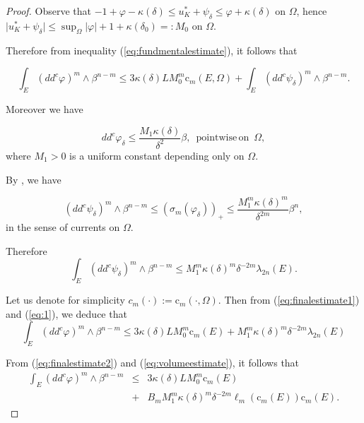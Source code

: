 \documentclass[12pt]{amsart}
\theoremstyle{definition}
\numberwithin{theorem}{section}
\numberwithin{equation}{section}
\begin{document}
{\begin{proof}
 Observe that $-1 + \varphi -  \kappa (\delta) \leq u_K^* + \psi_\delta  \leq \varphi + \kappa (\delta)$ on $\Omega$, hence   $\vert u_K^* + \psi_\delta\vert \leq \sup_{\Omega}  \vert \varphi\vert + 1 + \kappa (\delta_0) =: M_0$ on $\Omega$. 
 
 Therefore from inequality (\ref{eq:fundmentalestimate}), it follows that
 
\begin{equation} \label{eq:finalestimate1}
  \int_{E}(dd^c\varphi)^m\wedge\beta^{n-m} \leq 3 \kappa (\delta) L  M_0^m  \text{c}_m (E,\Omega) + \int_{E}(dd^c\psi_{\delta})^m\wedge\beta^{n-m}.
\end{equation}
 
 Moreover we have
 
 \begin{equation}\label{eq:1}
 dd^c\varphi_{\delta}\leq\frac{M_1 \kappa (\delta)}{\delta^{2}}  \beta, \, \, \, \mathrm{pointwise \, on} \, \, \, \Omega,
 \end{equation}
 where $M_1 > 0$ is a uniform constant depending only on $\Omega$.

By \cite[Theorem 3.3]{BZ20}, we have

\begin{equation}\label{eq:2}
 (dd^c\psi_{\delta})^m\wedge\beta^{n-m}  \leq  (\sigma_m (\varphi_{\delta}))_+ \leq\frac{M_1^m \kappa (\delta)^{m }}{\delta^{2 m}}  \beta^n,
 \end{equation}
 in the sense of currents on $ \Omega$.
 
 Therefore  
\begin{equation}\label{eq:3}
\int_{E}(dd^c\psi_{\delta})^m\wedge\beta^{n-m} \leq   M_1^{m} \kappa (\delta)^{m } \delta^{-2 m} \lambda_{2 n} (E).
 \end{equation}
 
 
Let us denote for simplicity $c_m (\cdot) :=  \text{c}_m (\cdot,\Omega)$. Then from (\ref{eq:finalestimate1}) and (\ref{eq:1}), we deduce that
\begin{equation}\label{eq:finalestimate2}
\int_{E}(dd^c\varphi)^m\wedge\beta^{n-m} \leq  3 \kappa (\delta) L M_0^m  \text{c}_m (E)+ M_1^{m} \kappa(\delta)^m \delta^{-2 m} \lambda_{2 n} (E) 
\end{equation} 

From (\ref{eq:finalestimate2}) and (\ref{eq:volumeestimate}), it follows that 
\begin{eqnarray} \label{eq:finalestimate3}
\int_{E}(dd^c\varphi)^m\wedge\beta^{n-m} & \leq &   3 \kappa (\delta) L M_0^m  \text{c}_m (E) \nonumber\\
&+&  B_m M_1^{m} \kappa(\delta)^m \delta^{-2 m} \ell_m (\text{c}_m (E)) \text{c}_m (E). 
\end{eqnarray} 



\end{proof}}
\end{document}
